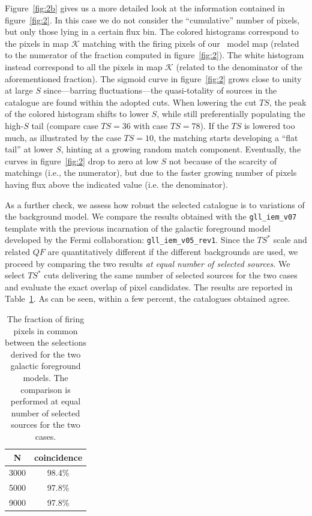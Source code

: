 %
Figure~\ref{fig:2b} gives us a more detailed look at the information contained in figure~\ref{fig:2}. In this case we do not consider the ``cumulative'' number of pixels, but only those lying in a certain flux bin. The colored histograms correspond to the pixels in map $\mathcal{K}$ matching with the firing pixels of our \dNdS~model map (related to the numerator of the fraction computed in figure~\ref{fig:2}). The white histogram instead correspond to all the pixels in map $\mathcal{K}$ (related to the denominator of the aforementioned fraction). The sigmoid curve in figure~\ref{fig:2} grows close to unity at large $S$ since---barring fluctuations---the quasi-totality of sources in the catalogue are found within the adopted cuts. When lowering the cut $TS$, the peak of the colored histogram shifts to lower $S$, while still preferentially populating the high-$S$ tail (compare case $TS=36$ with case $TS=78$). If the $TS$ is lowered too much, as illustrated by the case $TS=10$, the matching starts developing a ``flat tail'' at lower $S$, hinting at a growing  random match component. Eventually, the curves in figure~\ref{fig:2} drop to zero at low $S$ not because of the scarcity of matchings (i.e., the numerator), but due to the faster growing number of pixels having flux above the indicated value (i.e. the denominator).

As a further check, we assess how  robust the selected catalogue is to variations of the background model. We compare the results obtained with the \verb|gll_iem_v07| template with the previous incarnation of the galactic foreground model developed by the Fermi collaboration: \verb|gll_iem_v05_rev1|. Since the $TS^*$ scale and related $QF$ are quantitatively different if the different backgrounds are used, we proceed by comparing the two results \textit{at equal number of selected sources}.  We select $TS^*$ cuts delivering the same number of selected sources for the two cases and evaluate the exact overlap of pixel candidates. The results are reported in Table~\ref{tab:bck_comp}. As can be seen, within a few percent, the catalogues obtained agree.


\begin{table}[t]
    \renewcommand{\arraystretch}{1.2}
    \centering
    \begin{tabular}{|c|c|}  
    \hline
        N &  coincidence  \\
        \hline 
       3000 & 98.4\% \\
        \hline 
       5000 & 97.8\% \\
        \hline 
       9000 & 97.8\% \\
       \hline
    \end{tabular}
\caption{The fraction of firing pixels in common between the selections derived for the two galactic foreground models. The comparison is performed at equal number of selected sources for the two cases.}  
\label{tab:bck_comp}
\end{table}


